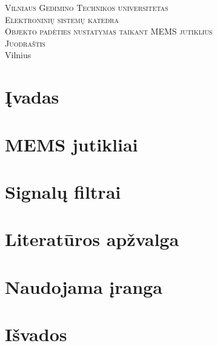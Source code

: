 \documentclass[11pt, a4paper]{article}
\begin{document}
  \begin{titlepage}
    \begin{center}
      \textsc{\LARGE Vilniaus Gedimino Technikos universitetas}\\[2mm]
      \textsc{\Large Elektroninių sistemų katedra}\\[70mm]
      \textsc{\Large Objekto padėties nustatymas taikant MEMS jutiklius}\\[60mm]
      \textsc{\Large Juodraštis}\\[60mm]
      \vfill
      {\large Vilnius \\ \the\year}
    \end{center}
  \end{titlepage}

  \tableofcontents

  \newpage

  \section{Įvadas}

  

  \section{MEMS jutikliai}

  

  \section{Signalų filtrai}

  

  \section{Literatūros apžvalga}

  

  \section{Naudojama įranga}

  

  \section{Išvados}

  

  \newpage

  
  
\end{document}
